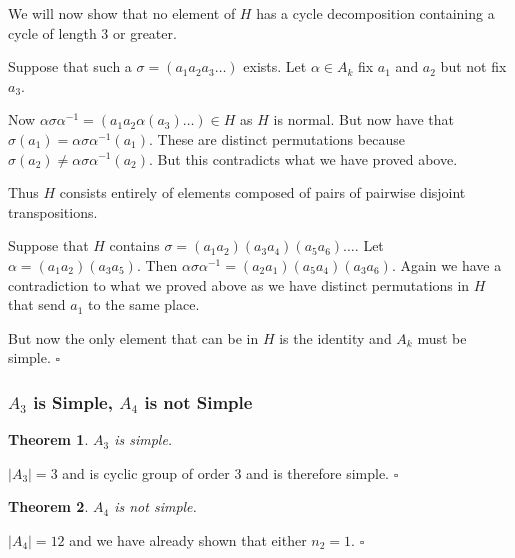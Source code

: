 \documentclass[10pt]{article}
\newtheorem{theorem}{Theorem}[section]
\newenvironment{proof}[1][Proof]{\begin{trivlist}
\item[\hskip \labelsep {\itshape #1}]}{\end{trivlist}}
\begin{document}
\begin{proof}
We will now show that no element of $H$ has a cycle decomposition containing a cycle of length $3$ or greater.

Suppose that such a $\sigma = (a_1 a_2 a_3 \ldots)$ exists. Let $\alpha \in A_k$ fix $a_1$ and $a_2$ but not fix $a_3$.

Now $\alpha\sigma\alpha^{-1} = (a_1 a_2 \alpha(a_3) \ldots) \in H$ as $H$ is normal. But now have that $\sigma(a_1) = \alpha\sigma\alpha^{-1}(a_1)$. These are distinct permutations because $\sigma(a_2) \neq \alpha\sigma\alpha^{-1}(a_2)$. But this contradicts what we have proved above.

Thus $H$ consists entirely of elements composed of pairs of pairwise disjoint transpositions.

Suppose that $H$ contains $\sigma = (a_1 a_2)(a_3 a_4)(a_5 a_6)\ldots$. Let $\alpha = (a_1 a_2)(a_3 a_5)$. Then $\alpha\sigma\alpha^{-1} = (a_2 a_1)(a_5 a_4)(a_3 a_6)$. Again we have a contradiction to what we proved above as we have distinct permutations in $H$ that send $a_1$ to the same place.

But now the only element that can be in $H$ is the identity and $A_k$ must be simple. $\square$
\end{proof}

\subsubsection{$A_3$ is Simple, $A_4$ is not Simple}

\begin{theorem}
$A_3$ is simple.
\end{theorem}

\begin{proof}
$|A_3| = 3$ and is  cyclic group of order $3$ and is therefore simple. $\square$
\end{proof}

\begin{theorem}
$A_4$ is not simple.
\end{theorem}

\begin{proof}
$|A_4| = 12$ and we have already shown that either $n_2 = 1$. $\square$
\end{proof}


\end{document}
